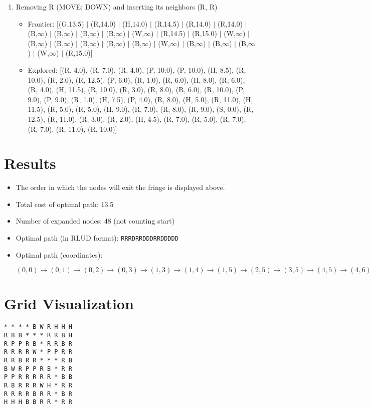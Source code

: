 \documentclass[12pt]{article}
\begin{document}
\begin{enumerate}
\item Removing R (MOVE: DOWN) and inserting its neighbors (R, R)
\begin{itemize}
\item Frontier: [(G,13.5) \(|\) (R,14.0) \(|\) (H,14.0) \(|\) (R,14.5) \(|\) (R,14.0) \(|\) (R,14.0) \(|\) (B,\(\infty\)) \(|\) (B,\(\infty\)) \(|\) (B,\(\infty\)) \(|\) (B,\(\infty\)) \(|\) (W,\(\infty\)) \(|\) (R,14.5) \(|\) (R,15.0) \(|\) (W,\(\infty\)) \(|\) (B,\(\infty\)) \(|\) (B,\(\infty\)) \(|\) (B,\(\infty\)) \(|\) (B,\(\infty\)) \(|\) (B,\(\infty\)) \(|\) (W,\(\infty\)) \(|\) (B,\(\infty\)) \(|\) (B,\(\infty\)) \(|\) (B,\(\infty\)) \(|\) (W,\(\infty\)) \(|\) (R,15.0)]
\item Explored: [(R, 4.0), (R, 7.0), (R, 4.0), (P, 10.0), (P, 10.0), (H, 8.5), (R, 10.0), (R, 2.0), (R, 12.5), (P, 6.0), (R, 1.0), (R, 6.0), (H, 8.0), (R, 6.0), (R, 4.0), (H, 11.5), (R, 10.0), (R, 3.0), (R, 8.0), (R, 6.0), (R, 10.0), (P, 9.0), (P, 9.0), (R, 1.0), (H, 7.5), (P, 4.0), (R, 8.0), (H, 5.0), (R, 11.0), (H, 11.5), (R, 5.0), (R, 5.0), (H, 9.0), (R, 7.0), (R, 8.0), (R, 9.0), (S, 0.0), (R, 12.5), (R, 11.0), (R, 3.0), (R, 2.0), (H, 4.5), (R, 7.0), (R, 5.0), (R, 7.0), (R, 7.0), (R, 11.0), (R, 10.0)]
\end{itemize}

\end{enumerate}
\section{Results}
\begin{itemize}
\item The order in which the nodes will exit the fringe is displayed above.
\item Total cost of optimal path: 13.5
\item Number of expanded nodes: 48 (not counting start)
\item Optimal path (in RLUD format): \texttt{RRRDRRDDDRRDDDDD}
\item Optimal path (coordinates):

$ (0,0) \rightarrow (0,1) \rightarrow (0,2) \rightarrow (0,3) \rightarrow (1,3) \rightarrow (1,4) \rightarrow (1,5) \rightarrow (2,5) \rightarrow (3,5) \rightarrow (4,5) \rightarrow (4,6) \rightarrow (4,7) \rightarrow (5,7) \rightarrow (6,7) \rightarrow (7,7) \rightarrow (8,7) \rightarrow (9,7) $

\end{itemize}
\section{Grid Visualization}
\begin{verbatim}
* * * * B W R H H H 
R B B * * * R R B H 
R P P R B * R R B R 
R R R R W * P P R R 
R R B R R * * * R B 
B W R P P R B * R R 
P P R R R R R * B B 
R B R R R W H * R R 
R R R R B R R * B R 
H H H B B R R * R R 
\end{verbatim}
\end{document}
